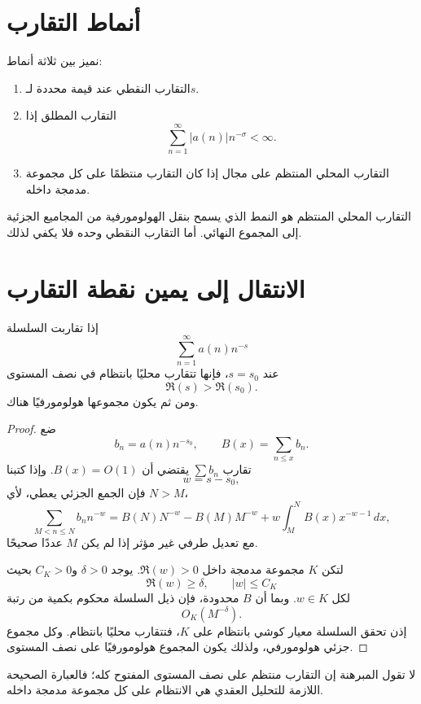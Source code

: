 \section{أنماط التقارب}

نميز بين ثلاثة أنماط:

\begin{enumerate}
  \item التقارب النقطي عند قيمة محددة لـ\(s\).
  \item التقارب المطلق إذا
  \[
  \sum_{n=1}^{\infty}|a(n)|n^{-\sigma}<\infty.
  \]
  \item التقارب المحلي المنتظم على مجال إذا كان التقارب منتظمًا على كل
  مجموعة مدمجة داخله.
\end{enumerate}

التقارب المحلي المنتظم هو النمط الذي يسمح بنقل الهولومورفية من المجاميع
الجزئية إلى المجموع النهائي. أما التقارب النقطي وحده فلا يكفي لذلك.

\section{الانتقال إلى يمين نقطة التقارب}

\begin{theorem}
\label{thm:dirichlet-series-right-half-plane}
\provedhere
إذا تقاربت السلسلة
\[
\sum_{n=1}^{\infty}a(n)n^{-s}
\]
عند \(s=s_0\)، فإنها تتقارب محليًا بانتظام في نصف المستوى
\[
\Re(s)>\Re(s_0).
\]
ومن ثم يكون مجموعها هولومورفيًا هناك.
\end{theorem}

\begin{proof}
ضع
\[
b_n=a(n)n^{-s_0},
\qquad
B(x)=\sum_{n\leq x}b_n.
\]
تقارب \(\sum b_n\) يقتضي أن \(B(x)=O(1)\). وإذا كتبنا
\[
w=s-s_0,
\]
فإن الجمع الجزئي يعطي، لأي \(N>M\)،
\[
\sum_{M<n\leq N}b_n n^{-w}
=
B(N)N^{-w}-B(M)M^{-w}
+w\int_M^N B(x)x^{-w-1}\,dx,
\]
مع تعديل طرفي غير مؤثر إذا لم يكن \(M\) عددًا صحيحًا.

لتكن \(K\) مجموعة مدمجة داخل \(\Re(w)>0\). يوجد \(\delta>0\) و\(C_K>0\)
بحيث
\[
\Re(w)\geq\delta,
\qquad |w|\leq C_K
\]
لكل \(w\in K\). وبما أن \(B\) محدودة، فإن ذيل السلسلة محكوم بكمية من
رتبة
\[
O_K(M^{-\delta}).
\]
إذن تحقق السلسلة معيار كوشي بانتظام على \(K\)، فتتقارب محليًا بانتظام.
وكل مجموع جزئي هولومورفي، ولذلك يكون المجموع هولومورفيًا على نصف المستوى.
\end{proof}

\begin{remark}
لا تقول المبرهنة إن التقارب منتظم على نصف المستوى المفتوح كله؛ فالعبارة
الصحيحة اللازمة للتحليل العقدي هي الانتظام على كل مجموعة مدمجة داخله.
\end{remark}

